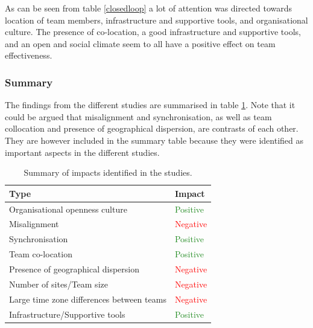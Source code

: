 As can be seen from table \ref{closedloop} a lot of attention was directed towards location of team members, infrastructure and supportive tools, and organisational culture. The presence of co-location, a good infrastructure and supportive tools, and an open and social climate seem to all have a positive effect on team effectiveness.

\subsubsection{Summary}

The findings from the different studies are summarised in table \ref{summary}. Note that it could be argued that misalignment and synchronisation, as well as team collocation and presence of geographical dispersion, are contrasts of each other. They are however included in the summary table because they were identified as important aspects in the different studies.

\begin{table}[H]
\begin{center}
    \begin{tabular}{ | p{8cm} | p{6cm} |}
    \hline
    \textbf{Type} & \textbf{Impact} \\ \hline
    Organisational openness culture & \textcolor{ForestGreen}{Positive} \\ \hline
    Misalignment & \textcolor{red}{Negative} \\ \hline
    Synchronisation & \textcolor{ForestGreen}{Positive} \\ \hline
    Team co-location & \textcolor{ForestGreen}{Positive} \\ \hline
    Presence of geographical dispersion & \textcolor{red}{Negative} \\ \hline
    Number of sites/Team size & \textcolor{red}{Negative} \\ \hline
    Large time zone differences between teams & \textcolor{red}{Negative} \\ \hline
    Infrastructure/Supportive tools & \textcolor{ForestGreen}{Positive} \\ \hline
    \end{tabular}
    \caption{Summary of impacts identified in the studies.}
    \label{summary}
\end{center}
\end{table}


